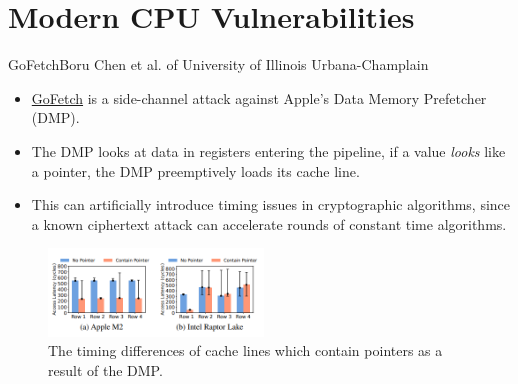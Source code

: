 \section{Modern CPU Vulnerabilities}
\frame{\sectionpage}

\begin{frame}{GoFetch}{Boru Chen et al. of University of Illinois Urbana-Champlain}
    \label{gofetch} 
    \begin{itemize}
        \item \href{https://www.usenix.org/system/files/usenixsecurity24-chen-boru.pdf}{\color{pink}GoFetch} is a side-channel attack against Apple's Data Memory Prefetcher (DMP).
        \item The DMP looks at data in registers entering the pipeline, if a value \textit{looks} like a pointer, the DMP preemptively loads its cache line. 
        \item This can artificially introduce timing issues in cryptographic algorithms, since a known ciphertext attack can accelerate rounds of constant time algorithms. 
    \end{itemize}
    \begin{figure}
            \centering
            \includegraphics[width=0.51\textwidth]{images/gofetch_graphic.png}
            \caption{The timing differences of cache lines which contain pointers as a result of the DMP.}
            \label{fig:gofetch-dmp-timing}
    \end{figure}
\end{frame}

